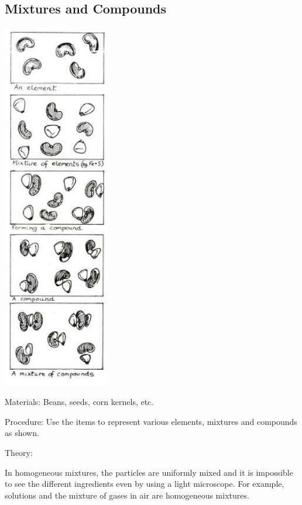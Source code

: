 \begin{multicols}{2}
\subsection{Mixtures and Compounds}

\begin{center}
\includegraphics[width=0.35\textwidth]{./img/source/mixtures-compounds.jpg}
\end{center}

\begin{description*}
\item[Materials:]{Beans, seeds, corn kernels, etc.}
\item[Procedure:]{Use the items to represent various elements, mixtures and compounds as shown.}
\item[Theory:]{In homogeneous mixtures, the particles are
uniformly mixed and it is impossible to see the
different ingredients even by using a light
microscope. For example, solutions and the
mixture of gases in air are homogeneous
mixtures.

}
\end{description*}
\end{multicols}
